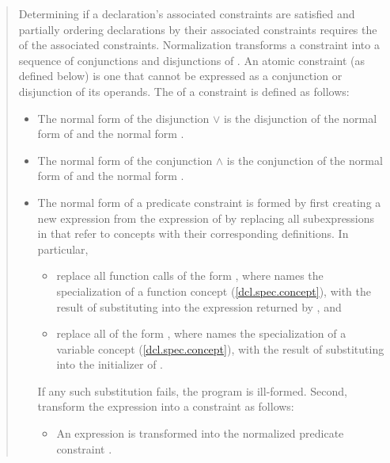 \begin{quote}
\pnum
Determining if a declaration's associated constraints are satisfied
and partially ordering declarations by their associated constraints
requires the  of the associated constraints. 
% 
Normalization transforms a constraint into a
sequence of conjunctions and disjunctions of .
% 
An atomic constraint (as defined below) is one that cannot be expressed
as a conjunction or disjunction of its operands.
% 
The  of a constraint is defined as follows:
% 
\begin{itemize}
\item The normal form of the disjunction  $\lor$  is the 
disjunction of the normal form of  and the normal form .

\item The normal form of the conjunction  $\land$  is the 
conjunction of the normal form of  and the normal form .

\item The normal form of a predicate constraint  is formed by
first creating a new expression  from the expression of  by 
replacing all subexpressions in  that refer to concepts with their 
corresponding definitions. In particular,
% 
\begin{itemize}

\item replace all function calls of the form 
, where  
names the specialization of a function concept  (\ref{dcl.spec.concept}),
with the result of substituting  into the 
expression returned by , and

\item replace all  of the form 
, where  
names the specialization of a variable concept  (\ref{dcl.spec.concept}),
with the result of substituting  
into the initializer of .
\end{itemize}
% 
If any such substitution fails, the program is ill-formed.
% 
Second, transform the expression  into a constraint as follows:
\begin{itemize}
\item An expression  is transformed into the normalized predicate 
constraint .


\end{itemize}
\end{itemize}
\end{quote}
